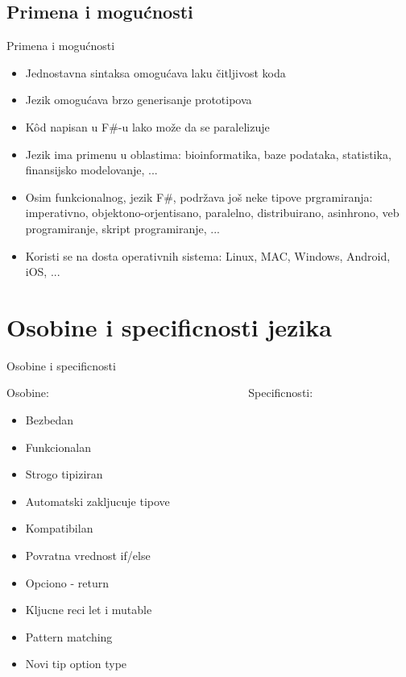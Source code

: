 \documentclass{beamer}
\begin{document}
\subsection*{Primena i mogućnosti}
\begin{frame}{Primena i mogućnosti}

\begin{itemize}
\item Jednostavna sintaksa omogućava laku čitljivost koda
\item Jezik omogućava brzo generisanje prototipova
\item Kôd napisan u F\#-u lako može da se paralelizuje
\item Jezik ima primenu u oblastima: bioinformatika, baze podataka, statistika, finansijsko modelovanje, ...
\item Osim funkcionalnog, jezik F\#, podržava još neke tipove prgramiranja: imperativno, objektono-orjentisano, paralelno, distribuirano, asinhrono, veb programiranje, skript programiranje, ...
\item Koristi se na dosta operativnih sistema: Linux, MAC, Windows, Android, iOS, ...
\end{itemize}

\end{frame}

\section{Osobine i specificnosti jezika}
\begin{frame}{Osobine i specificnosti}
\begin{center}
Osobine: ~~~~~~~~~~~~~~~~~~~~~~~~~~~~~~~~~~ Specificnosti:
\begin{multicols}{2}
\begin{itemize}
  \item Bezbedan
  \item Funkcionalan
  \item Strogo tipiziran
  \item Automatski zakljucuje tipove
  \item Kompatibilan
  \item Povratna vrednost if/else
  \item Opciono - return
  \item Kljucne reci let i mutable
  \item Pattern matching
  \item Novi tip option type
\end{itemize}
\end{multicols}
\end{center}
\end{frame}
\end{document}
